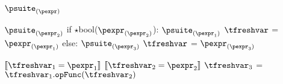 \documentclass{article}
\begin{document}
\begin{mathpar}
\end{mathpar}

\newsavebox{\usubBox}
\begin{lrbox}{\usubBox}
\begin{python}
$\psuite_{(\pexpr)}$
\end{python}
\end{lrbox}

\begin{mathpar}
\end{mathpar}

\newsavebox{\ifExpBox}
\begin{lrbox}{\ifExpBox}
\begin{python}
$\psuite_{(\pexpr_2)}$
if $\star$bool($\pexpr_{(\pexpr_2)}$):
  $\psuite_{(\pexpr_1)}$
  $\tfreshvar$ = $\pexpr_{(\pexpr_1)}$
else:
  $\psuite_{(\pexpr_3)}$
  $\tfreshvar$ = $\pexpr_{(\pexpr_3)}$
\end{python}
\end{lrbox}

\begin{mathpar}
\end{mathpar}

\newsavebox{\compareBox}
\begin{lrbox}{\compareBox}
\begin{python}
$\meaningof{\tfreshvar_1 = \pexpr_1}$
$\meaningof{\tfreshvar_2 = \pexpr_2}$
$\tfreshvar_3$ = $\tfreshvar_1.\mathtt{opFunc}(\tfreshvar_2)$
\end{python}
\end{lrbox}

\begin{mathpar}
\end{mathpar}
\end{document}
